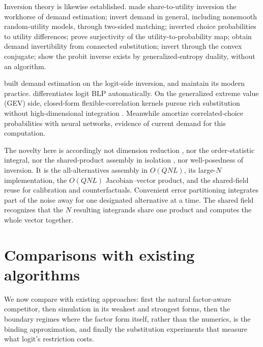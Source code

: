 \documentclass[12pt]{article}
\theoremstyle{remark}
\begin{document}
Inversion theory is likewise established. \citet{berry1994} made
share-to-utility inversion the workhorse of demand estimation;
\citet{bonnet2022} invert demand in general, including nonsmooth
random-utility models, through two-sided matching;
\citet{hotz1993}
inverted choice probabilities to utility differences; \citet{norets2013}
prove surjectivity of the utility-to-probability map;
\citet{bgh2013} obtain demand invertibility from
connected substitution;
\citet{chiong2016} invert through the convex
conjugate; \citet{fosgerau2020} show the probit inverse exists by
generalized-entropy duality, without an algorithm.

 \citet{berry1995} built demand
estimation on the logit-side inversion, and \citet{conlon2020}
maintain its modern practice. \citet{chia2021}
differentiates logit BLP automatically. On the generalized extreme value (GEV) side, closed-form
flexible-correlation kernels pursue rich substitution without
high-dimensional integration \citep{tinessa2020,tinessa2021}.
Meanwhile \citet{huch2026}
amortize correlated-choice probabilities with neural networks, evidence of
current demand for this computation.

The novelty here is accordingly not dimension reduction
\citep{curnow1962}, nor the order-statistic integral, nor the
shared-product assembly in isolation \citep{mahani2019,cotton2021}, nor
well-posedness of inversion. It is the
all-alternatives assembly in $O(QNL)$, its large-$N$ implementation, the
$O(QNL)$ Jacobian--vector product, and the shared-field reuse for
calibration and counterfactuals. Convenient error partitioning
\citep{train1995} integrates part of the noise away for one designated
alternative at a time. The shared field recognizes that the $N$
resulting integrands share one product and computes the whole vector
together.

\section{Comparisons with existing algorithms}\label{sec:comparisons}
\label{sec:boundary}

We now compare with existing approaches: first the natural
factor-aware competitor, then simulation in its weakest and strongest
forms, then the boundary regimes where the factor form itself, rather
than the numerics, is the binding approximation, and finally the
substitution experiments that measure what logit's restriction costs.
\end{document}
